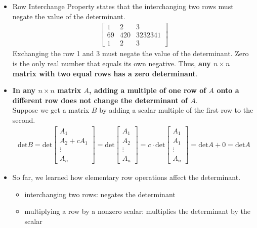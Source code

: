\begin{itemize}
  \item Row Interchange Property states that the interchanging two rows must negate the value of the determinant.
    \begin{align*}
      \begin{bmatrix}
        1 & 2 & 3\\
        69 & 420 & 3232341\\
        1 & 2 & 3
      \end{bmatrix}
    \end{align*}
    Exchanging the row 1 and 3 must negate the value of the determinant.
    Zero is the only real number that equals its own negative.
    Thus, \textbf{any $n \times n$ matrix with two equal rows has a zero determinant}.
  \item \textbf{In any $n \times n$ matrix $A$, adding a multiple of one row of $A$ onto a different row does not change the determinant of $A$}.\\
    Suppose we get a matrix $B$ by adding a scalar multiple of the first row to the second.
    \begin{align*}
      \mathrm{det} B
      = \mathrm{det} \begin{bmatrix}
        A_1\\
        A_2 + c A_1\\
        \vdots\\
        A_n
      \end{bmatrix}
      = \mathrm{det} \begin{bmatrix}
        A_1\\
        A_2\\
        \vdots\\
        A_n
      \end{bmatrix}
      = c \cdot \mathrm{det} \begin{bmatrix}
        A_1\\
        A_1\\
        \vdots\\
        A_n
      \end{bmatrix}
      = \mathrm{det} A + 0
      = \mathrm{det} A
    \end{align*}
  \item So far, we learned how elementary row operations affect the determinant.
    \begin{itemize}
      \item interchanging two rows: negates the determinant
      \item multiplying a row by a nonzero scalar: multiplies the determinant by the scalar

\end{itemize}
\end{itemize}
